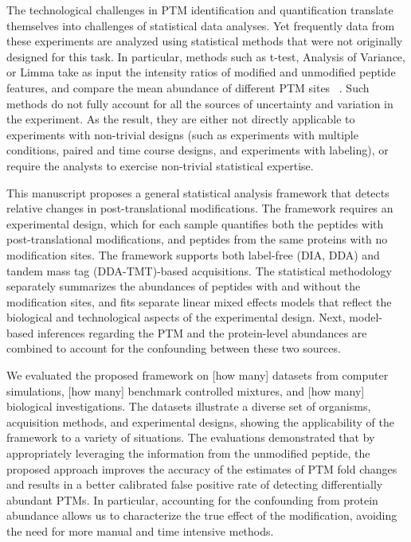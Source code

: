 \documentclass[mcp]{article}
\numberwithin{table}{section}
\def\todo#1{{\color{red}[#1]}}
\begin{document}
The technological challenges in PTM identification and quantification translate themselves into challenges of statistical data analyses. Yet frequently data from these experiments are analyzed using statistical methods that were not originally designed for this task. In particular, methods such as t-test, Analysis of Variance, or Limma take as input the intensity ratios of modified and unmodified peptide features, and compare the mean abundance of different PTM sites~ \cite{Ritchie_15a}. Such methods do not fully account for all the sources of uncertainty and variation in the experiment. As the result, they are either not directly applicable to experiments with non-trivial designs (such as experiments with multiple conditions, paired and time course designs, and experiments with labeling), or require the analysts to exercise non-trivial statistical expertise.

This manuscript proposes a general statistical analysis framework that detects relative changes in post-translational modifications. The framework requires an experimental design, which for each sample quantifies both the peptides with post-translational modifications, and peptides from the same proteins with no modification sites. The framework supports both label-free (DIA, DDA) and tandem mass tag (DDA-TMT)-based acquisitions. The statistical methodology separately summarizes the abundances of peptides with and without the modification sites, and fits separate linear mixed effects models that reflect the biological and technological aspects of the experimental design. Next, model-based inferences regarding the PTM and the protein-level abundances are combined to account for the confounding between these two sources.

We evaluated the proposed framework on \todo{how many} datasets from computer simulations, \todo{how many} benchmark controlled mixtures, and \todo{how many} biological investigations. The datasets illustrate a diverse set of organisms, acquisition methods, and experimental designs, showing the applicability of the framework to a variety of situations. The evaluations demonstrated that by appropriately leveraging the information from the unmodified peptide, the proposed approach improves the accuracy of the estimates of PTM fold changes and results in a better calibrated false positive rate of detecting differentially abundant PTMs. In particular, accounting for the confounding from protein abundance allows us to characterize the true effect of the modification, avoiding the need for more manual and time intensive methods.
\end{document}

